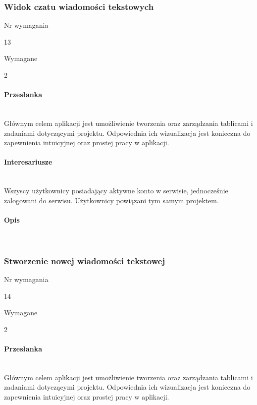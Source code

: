 \documentclass[eng,printmode]{mgr}
\begin{document}
\subsubsection{Widok czatu wiadomości tekstowych}
\begin{labeling}{Nr wymagania}
\item [Nr wymagania:] 13
\item [Typ:] Wymagane
\item [Powiązania:] 2
\end{labeling}

\paragraph{Przesłanka}\ \\
Głównym celem aplikacji jest umożliwienie tworzenia oraz zarządzania tablicami i zadaniami dotyczącymi projektu. Odpowiednia ich wizualizacja jest konieczna do zapewnienia intuicyjnej oraz prostej pracy w aplikacji.

\paragraph{Interesariusze}\ \\
Wszyscy użytkownicy posiadający aktywne konto w serwisie, jednocześnie zalogowani do serwisu. Użytkownicy powiązani tym samym projektem.

\paragraph{Opis}\ \\
\newpage

\subsubsection{Stworzenie nowej wiadomości tekstowej}
\begin{labeling}{Nr wymagania}
\item [Nr wymagania:] 14
\item [Typ:] Wymagane
\item [Powiązania:] 2
\end{labeling}
\paragraph{Przesłanka}\ \\
Głównym celem aplikacji jest umożliwienie tworzenia oraz zarządzania tablicami i zadaniami dotyczącymi projektu. Odpowiednia ich wizualizacja jest konieczna do zapewnienia intuicyjnej oraz prostej pracy w aplikacji.
\end{document}
